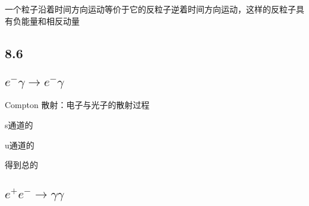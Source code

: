 一个粒子沿着时间方向运动等价于它的反粒子逆着时间方向运动，这样的反粒子具有负能量和相反动量


\subsection{8.6}

\subsection{$e^{-}\gamma\to e^{-}\gamma$}
Compton 散射：电子与光子的散射过程

s通道的

u通道的

得到总的



\subsection{$e^+e^-\to\gamma\gamma$}





